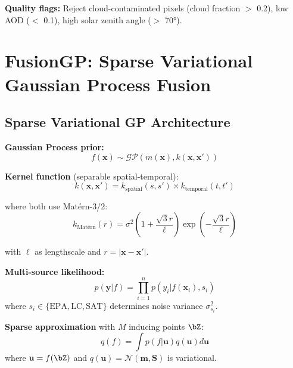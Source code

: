\documentclass[11pt,letterpaper]{article}
\newcommand{\bx}{\mathbf{x}}
\newcommand{\by}{\mathbf{y}}
\newcommand{\Normal}{\mathcal{N}}
\newcommand{\GP}{\mathcal{GP}}
\begin{document}
\textbf{Quality flags:} Reject cloud-contaminated pixels (cloud fraction $>$ 0.2), low AOD ($<$ 0.1), high solar zenith angle ($>$ 70°).


\section{FusionGP: Sparse Variational Gaussian Process Fusion} \label{sec:fusiongp}

\subsection{Sparse Variational GP Architecture}

\textbf{Gaussian Process prior:}
\begin{equation}
f(\bx) \sim \GP(m(\bx), k(\bx, \bx'))
\label{eq:gp_prior}
\end{equation}

\textbf{Kernel function} (separable spatial-temporal):
\begin{equation}
k(\bx, \bx') = k_{\text{spatial}}(s, s') \times k_{\text{temporal}}(t, t')
\label{eq:kernel_separable}
\end{equation}

where both use Matérn-3/2:
\begin{equation}
k_{\text{Matérn}}(r) = \sigma^2 \left(1 + \frac{\sqrt{3}r}{\ell}\right) \exp\left(-\frac{\sqrt{3}r}{\ell}\right)
\label{eq:matern}
\end{equation}

with $\ell$ as lengthscale and $r = |\bx - \bx'|$.

\textbf{Multi-source likelihood:}
\begin{equation}
p(\by | f) = \prod_{i=1}^{n} p(y_i | f(\bx_i), s_i)
\label{eq:multi_source_likelihood}
\end{equation}
where $s_i \in \{\text{EPA}, \text{LC}, \text{SAT}\}$ determines noise variance $\sigma^2_{s_i}$.

\textbf{Sparse approximation} with $M$ inducing points $\bZ$:
\begin{equation}
q(f) = \int p(f | \mathbf{u}) q(\mathbf{u}) d\mathbf{u}
\label{eq:svgp}
\end{equation}
where $\mathbf{u} = f(\bZ)$ and $q(\mathbf{u}) = \Normal(\mathbf{m}, \mathbf{S})$ is variational.
\end{document}
